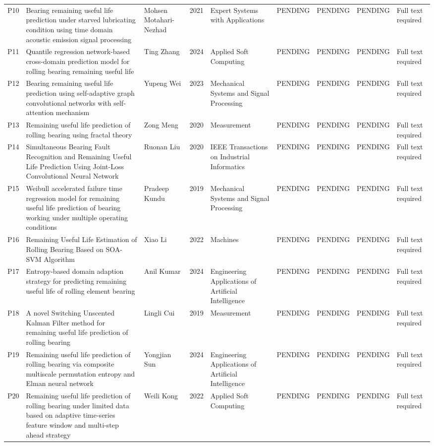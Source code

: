 \documentclass[10pt]{article}
\begin{document}
\begin{longtable}{p{0.7cm} p{3.2cm} p{2.6cm} p{1.0cm} p{1.8cm} p{1.5cm} p{1.5cm} p{1.5cm} p{1.9cm}}
P10 & Bearing remaining useful life prediction under starved lubricating condition using time domain acoustic emission signal processing & Mohsen Motahari-Nezhad & 2021 & Expert Systems with Applications & PENDING & PENDING & PENDING & Full text required \\
P11 & Quantile regression network-based cross-domain prediction model for rolling bearing remaining useful life & Ting Zhang & 2024 & Applied Soft Computing & PENDING & PENDING & PENDING & Full text required \\
P12 & Bearing remaining useful life prediction using self-adaptive graph convolutional networks with self-attention mechanism & Yupeng Wei & 2023 & Mechanical Systems and Signal Processing & PENDING & PENDING & PENDING & Full text required \\
P13 & Remaining useful life prediction of rolling bearing using fractal theory & Zong Meng & 2020 & Measurement & PENDING & PENDING & PENDING & Full text required \\
P14 & Simultaneous Bearing Fault Recognition and Remaining Useful Life Prediction Using Joint-Loss Convolutional Neural Network & Ruonan Liu & 2020 & IEEE Transactions on Industrial Informatics & PENDING & PENDING & PENDING & Full text required \\
P15 & Weibull accelerated failure time regression model for remaining useful life prediction of bearing working under multiple operating conditions & Pradeep Kundu & 2019 & Mechanical Systems and Signal Processing & PENDING & PENDING & PENDING & Full text required \\
P16 & Remaining Useful Life Estimation of Rolling Bearing Based on SOA-SVM Algorithm & Xiao Li & 2022 & Machines & PENDING & PENDING & PENDING & Full text required \\
P17 & Entropy-based domain adaption strategy for predicting remaining useful life of rolling element bearing & Anil Kumar & 2024 & Engineering Applications of Artificial Intelligence & PENDING & PENDING & PENDING & Full text required \\
P18 & A novel Switching Unscented Kalman Filter method for remaining useful life prediction of rolling bearing & Lingli Cui & 2019 & Measurement & PENDING & PENDING & PENDING & Full text required \\
P19 & Remaining useful life prediction of rolling bearing via composite multiscale permutation entropy and Elman neural network & Yongjian Sun & 2024 & Engineering Applications of Artificial Intelligence & PENDING & PENDING & PENDING & Full text required \\
P20 & Remaining useful life prediction of rolling bearing under limited data based on adaptive time-series feature window and multi-step ahead strategy & Weili Kong & 2022 & Applied Soft Computing & PENDING & PENDING & PENDING & Full text required \\
\bottomrule
\end{longtable}
\end{document}
